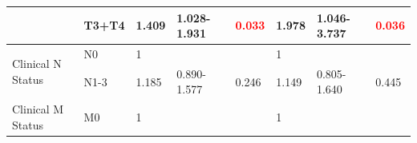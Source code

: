 \documentclass[jpm,article,submit,moreauthors,pdftex]{Definitions/mdpi}
\begin{document}
\begin{table}[hp]
{\begin{tabular}{|l|l|l|l|l|l|l|l|}
\cline{2-8}
                                        & T3+T4                                                                               & 1.409                                                                          & 1.028-1.931                                                                   & \textcolor{red}{0.033}                                                        & 1.978                                                                          & 1.046-3.737                                                                   & \textcolor{red}{0.036}                                                         \\ 
\hline
\multirow{2}{*}{Clinical N Status}      & {\cellcolor[rgb]{0.62,0.812,0.878}}N0                                               & {\cellcolor[rgb]{0.62,0.812,0.878}}1                                           & {\cellcolor[rgb]{0.62,0.812,0.878}}                                           & {\cellcolor[rgb]{0.62,0.812,0.878}}                                           & {\cellcolor[rgb]{0.62,0.812,0.878}}1                                           & {\cellcolor[rgb]{0.62,0.812,0.878}}                                           & {\cellcolor[rgb]{0.62,0.812,0.878}}                                            \\ 
\cline{2-8}
                                        & N1-3                                                                                & 1.185                                                                          & 0.890-1.577                                                                   & 0.246                                                                         & 1.149                                                                          & 0.805-1.640                                                                   & 0.445                                                                          \\ 
\hline
\multirow{2}{*}{Clinical M Status}      & {\cellcolor[rgb]{0.62,0.812,0.878}}M0                                               & {\cellcolor[rgb]{0.62,0.812,0.878}}1                                           & {\cellcolor[rgb]{0.62,0.812,0.878}}                                           & {\cellcolor[rgb]{0.62,0.812,0.878}}                                           & {\cellcolor[rgb]{0.62,0.812,0.878}}1                                           & {\cellcolor[rgb]{0.62,0.812,0.878}}                                           & {\cellcolor[rgb]{0.62,0.812,0.878}}                                            \\ 

\end{tabular}}
\end{table}
\end{document}
